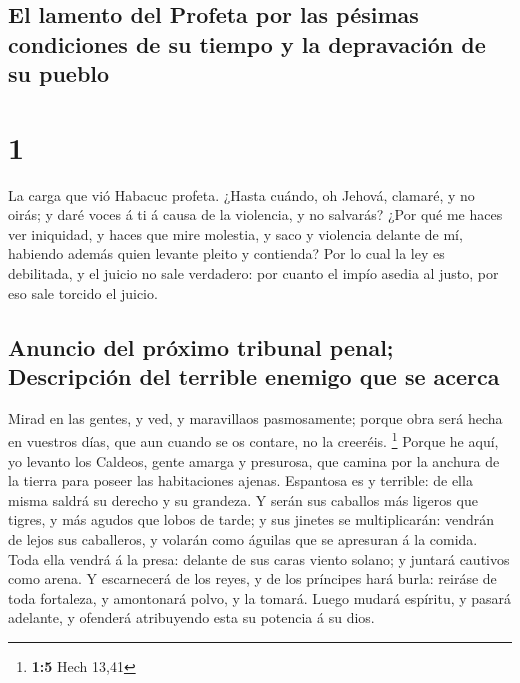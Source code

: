\hypertarget{el-lamento-del-profeta-por-las-puxe9simas-condiciones-de-su-tiempo-y-la-depravaciuxf3n-de-su-pueblo}{%
\subsection{El lamento del Profeta por las pésimas condiciones de su
tiempo y la depravación de su
pueblo}\label{el-lamento-del-profeta-por-las-puxe9simas-condiciones-de-su-tiempo-y-la-depravaciuxf3n-de-su-pueblo}}

\hypertarget{section}{%
\section{1}\label{section}}

 La carga que vió Habacuc profeta.  ¿Hasta
cuándo, oh Jehová, clamaré, y no oirás; y daré voces á ti á causa de la
violencia, y no salvarás?  ¿Por qué me haces ver
iniquidad, y haces que mire molestia, y saco y violencia delante de mí,
habiendo además quien levante pleito y contienda?  Por lo
cual la ley es debilitada, y el juicio no sale verdadero: por cuanto el
impío asedia al justo, por eso sale torcido el juicio.

\hypertarget{anuncio-del-pruxf3ximo-tribunal-penal-descripciuxf3n-del-terrible-enemigo-que-se-acerca}{%
\subsection{Anuncio del próximo tribunal penal; Descripción del terrible
enemigo que se
acerca}\label{anuncio-del-pruxf3ximo-tribunal-penal-descripciuxf3n-del-terrible-enemigo-que-se-acerca}}

 Mirad en las gentes, y ved, y maravillaos pasmosamente;
porque obra será hecha en vuestros días, que aun cuando se os contare,
no la creeréis. \footnote{\textbf{1:5} Hech 13,41}  Porque
he aquí, yo levanto los Caldeos, gente amarga y presurosa, que camina
por la anchura de la tierra para poseer las habitaciones ajenas.
 Espantosa es y terrible: de ella misma saldrá su derecho
y su grandeza.  Y serán sus caballos más ligeros que
tigres, y más agudos que lobos de tarde; y sus jinetes se multiplicarán:
vendrán de lejos sus caballeros, y volarán como águilas que se apresuran
á la comida.  Toda ella vendrá á la presa: delante de sus
caras viento solano; y juntará cautivos como arena.  Y
escarnecerá de los reyes, y de los príncipes hará burla: reiráse de toda
fortaleza, y amontonará polvo, y la tomará.  Luego mudará
espíritu, y pasará adelante, y ofenderá atribuyendo esta su potencia á
su dios.

